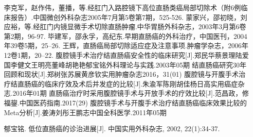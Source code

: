 \documentclass[a4paper,11pt,onecolumn,twoside]{article}
\begin{document}
\begin{multicols}{2}
\begin{thebibliography}{14}
        李克军，赵作伟，董播，等.经肛门入路腔镜下高位直肠类癌局部切除术（附6例临床报告）.中国微创外科杂志2005年7月第5卷第7期，525-526.
        蒙家兴，邵初晓，刘应裕，等.经肛门内镜显微手术切除直肠肿瘤.中华胃肠外科杂志，2003年3月第6卷第2期，96-97.
        毕建军，邵永孚，高纪东.早期直肠癌的外科治疗，中国医刊，2004年39卷5期，25--26.
        王辉，直肠癌局部切除适应症及注意事项.肿瘤学杂志，2006年12卷1期，20--22.
        腹腔镜手术治疗结直肠癌安全性的临床研究[J].郑民华蔡景理陆爱国李健文王明亮董峰胡艳艳郁宝铭外科理论与实践.2003年05期
        结直肠癌研究30年回顾和现状[J].郑树张苏展黄彦钦实用肿瘤杂志2016，31(01)
        腹腔镜与开腹手术治疗结直肠癌的临床疗效及术后并发症的比较[J].朱渝军陈刚胡佳杨日高实用癌症杂志.2016年01期
        直肠癌治疗时采用腹腔镜手术与开放手术的疗效比较[J].范昌政，修福鋆.中国医药指南.2017(29)
        腹腔镜手术与开腹手术治疗结直肠癌临床效果比较的Meta分析[J].姜涛刘彤王鹏志中国全科医学.2011年05期


        郁宝铭. 低位直肠癌的诊治进展[J]. 中国实用外科杂志, 2002, 22(1):34-37.
    \end{thebibliography}
    \normalsize

\end{multicols}


\clearpage
\end{document}
